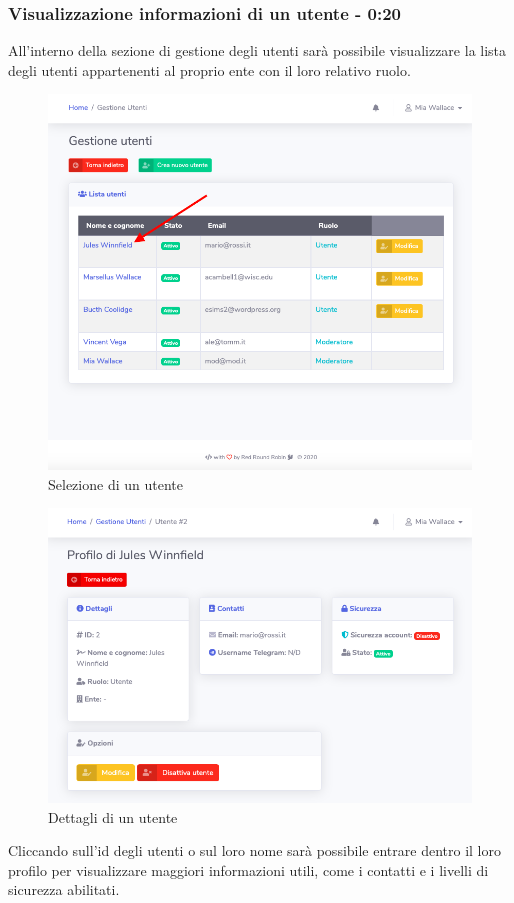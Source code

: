 	\subsubsection{Visualizzazione informazioni di un utente - 0:20}
		All'interno della sezione di gestione degli utenti sarà possibile visualizzare la lista degli utenti appartenenti al proprio ente con il loro relativo ruolo.
		\begin{figure}[H]
		\centering
		\includegraphics[scale=0.600]{res/images/mod/selUtente.png}
		\caption{Selezione di un utente}
	\end{figure}
	\begin{figure}[H]
		\centering
		\includegraphics[scale=0.600]{res/images/mod/dettagliUtente.png}
		\caption{Dettagli di un utente}
	\end{figure}
		Cliccando sull'id degli utenti o sul loro nome sarà possibile entrare dentro il loro profilo per visualizzare maggiori informazioni utili, come i contatti e i livelli di sicurezza abilitati.

